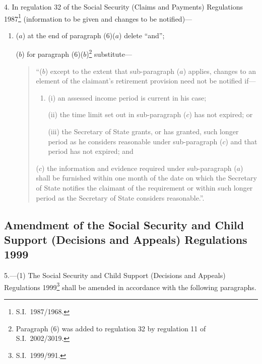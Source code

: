 \documentclass[12pt,a4paper]{article}
\begin{document}
4.  In regulation 32 of the Social Security (Claims and Payments) Regulations 1987\footnote{S.I.\ 1987/1968.} (information to be given and changes to be notified)—
\begin{enumerate}\item[]
($a$) at the end of paragraph (6)($a$)  delete “and”;

($b$) for paragraph (6)($b$)\footnote{Paragraph (6) was added to regulation 32 by regulation 11 of S.I.\ 2002/3019.} substitute—
\begin{quotation}
“($b$) except to the extent that sub-paragraph ($a$)  applies, changes to an element of the claimant’s retirement provision need not be notified if—
\begin{enumerate}\item[]
(i) an assessed income period is current in his case;

(ii) the time limit set out in sub-paragraph ($c$)  has not expired; or

(iii) the Secretary of State grants, or has granted, such longer period as he considers reasonable under sub-paragraph ($c$)  and that period has not expired; and
\end{enumerate}

($c$) the information and evidence required under sub-paragraph ($a$)  shall be furnished within one month of the date on which the Secretary of State notifies the claimant of the requirement or within such longer period as the Secretary of State considers reasonable.”.
\end{quotation}
\end{enumerate}

\subsection[5. Amendment of the Social Security and Child Support (Decisions and Appeals) Regulations 1999]{Amendment of the Social Security and Child Support (Decisions and Appeals) Regulations 1999}

5.---(1)  The Social Security and Child Support (Decisions and Appeals) Regulations 1999\footnote{S.I.\ 1999/991.} shall be amended in accordance with the following paragraphs.
\end{document}
